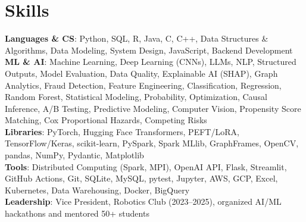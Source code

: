 \documentclass[letterpaper,11pt]{article}
\begin{document}
\section{Skills}
 \begin{itemize}[leftmargin=0.15in, label={}]
    \small{\item{
     \textbf{Languages \& CS}{: Python, SQL, R, Java, C, C++, Data Structures \& Algorithms, Data Modeling, System Design, JavaScript, Backend Development} \\
     \textbf{ML \& AI}{: Machine Learning, Deep Learning (CNNs), LLMs, NLP, Structured Outputs, Model Evaluation, Data Quality, Explainable AI (SHAP), Graph Analytics, Fraud Detection, Feature Engineering, Classification, Regression, Random Forest, Statistical Modeling, Probability, Optimization, Causal Inference, A/B Testing, Predictive Modeling, Computer Vision, Propensity Score Matching, Cox Proportional Hazards, Competing Risks} \\
     \textbf{Libraries}{: PyTorch, Hugging Face Transformers, PEFT/LoRA, TensorFlow/Keras, scikit-learn, PySpark, Spark MLlib, GraphFrames, OpenCV, pandas, NumPy, Pydantic, Matplotlib} \\
     \textbf{Tools}{: Distributed Computing (Spark, MPI), OpenAI API, Flask, Streamlit, GitHub Actions, Git, SQLite, MySQL, pytest, Jupyter, AWS, GCP, Excel, Kubernetes, Data Warehousing, Docker, BigQuery} \\
     \textbf{Leadership}{: Vice President, Robotics Club (2023--2025), organized AI/ML hackathons and mentored 50+ students}
    }}
 \end{itemize}
\end{document}
